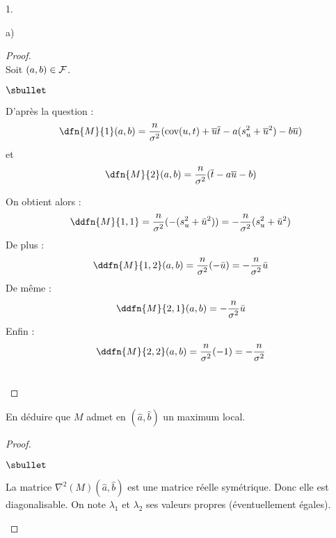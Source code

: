 \begin{noliste}{1.}
\begin{noliste}{a)}
  \begin{proof}~\\
   Soit $(a,b) \in {\cal F}$.
   \begin{noliste}{$\sbullet$}
    \item D'après la question  :
    \[
     \dfn{M}{1}(a,b) = \dfrac{n}{\sigma^2}(\text{cov}(u,t) +
    \overline{u}\overline{t}-a(s_u^2 + \overline{u}^2)-b\overline{u})
    \]
    et
    \[
     \dfn{M}{2}(a,b) = \dfrac{n}{\sigma^2}(\overline{t}-a\overline{u}-b)
    \]
    
    \item On obtient alors :
    \[
     \ddfn{M}{1,1} = \dfrac{n}{\sigma^2}(-(s_u^2+ \bar{u}^2)) = 
     -\dfrac{n}{\sigma^2}(s_u^2+ \bar{u}^2)
    \]
    De plus :
    \[
     \ddfn{M}{1,2}(a,b) = \dfrac{n}{\sigma^2}(-\bar{u}) = 
     -\dfrac{n}{\sigma^2} \bar{u}
    \]
    De même :
    \[
     \ddfn{M}{2,1}(a,b) = -\dfrac{n}{\sigma^2} \bar{u}
    \]
    Enfin :
    \[
     \ddfn{M}{2,2}(a,b) = \dfrac{n}{\sigma^2}(-1) = 
     -\dfrac{n}{\sigma^2}
    \]
   \end{noliste}
   ~\\[-1cm]
  \end{proof}
    
  \item En déduire que $M$ admet en $(\hat{a},\hat{b})$ un maximum 
  local.
  
  \begin{proof}~
   \begin{noliste}{$\sbullet$}
    \item La matrice $\nabla^2(M)(\hat{a}, \hat{b})$ est une matrice
    réelle symétrique. Donc elle est diagonalisable. On note 
    $\lambda_1$ et $\lambda_2$ ses valeurs propres 
    (éventuellement égales).
    

\end{noliste}
\end{proof}
\end{noliste}
\end{noliste}
